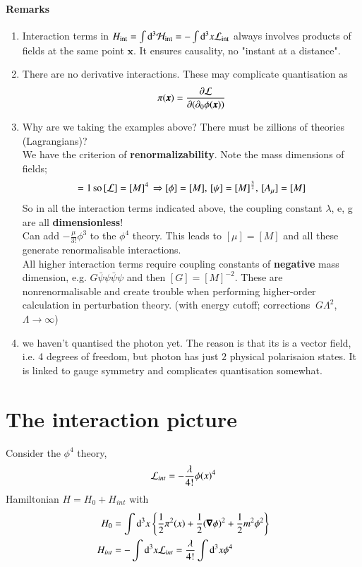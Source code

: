 \paragraph{Remarks}
\begin{enumerate}
	\item Interaction terms in $H_\text{int} = \int \dd^3 \mathcal{H}_\text{int} = - \int\dd^3x\mathcal{L}_\text{int}$ always involves products of fields at the same point $\pmb{x}$. It ensures causality, no "instant at a distance".
	\item There are no derivative interactions. These may complicate quantisation as $$\pi(\pmb{x}) = \frac{\partial\mathcal{L}}{\partial(\partial_0 \phi(\pmb{x}))}$$
	\item Why are we taking the examples above? There must be zillions of theories (Lagrangians)? \\
			We have the criterion of \textbf{renormalizability}. Note the mass dimensions of fields;
			\begin{align*}
				[S] = 1 \, \text{so} \, [\lag] = [M]^4 \, \Rightarrow [\phi] = [M] ,\, [\psi] = [M]^{\frac{3}{2}} ,\, [A_\mu] = [M]
			\end{align*}
			So in all the interaction terms indicated above, the coupling constant $\lambda$, e, g are all \textbf{dimensionless}!\\
			Can add $-\frac{\mu}{3!}\phi^3$ to the $\phi^4$ theory. This leads to $[\mu] = [M]$ and all these generate renormalisable interactions. \\
			All higher interaction terms require coupling constants of \textbf{negative} mass dimension, e.g. $G\bar{\psi}\psi\bar{\psi}\psi$ and then $[G] = [M]^{-2}$. These are nonrenormalisable and create trouble when performing higher-order calculation in perturbation theory.
			(with energy cutoff; corrections $~G\Lambda^2$, $\Lambda \rightarrow \infty$)
		\item we haven't quantised the photon yet. The reason is that its is a vector field, i.e. 4 degrees of freedom, but photon has just $2$ physical polarisaion states. It is linked to gauge symmetry and complicates quantisation somewhat.
\end{enumerate}
\section{The interaction picture}
Consider the $\phi^4$ theory, 
\begin{align}
\mathcal{L}_{int} = -\frac{\lambda}{4!} \phi(x)^4
\end{align}
Hamiltonian $H = H_0 + H_{int}$ with 
\begin{align}
	H_0 &= \int\dd^3 x \left\{ \frac{1}{2}\pi^2(x) + \frac{1}{2}(\pmb{\nabla}\phi)^2 + \frac{1}{2}m^2\phi^2 \right\}\\
	H_{int} &= -\int\dd^3x \mathcal{L}_{int} = \frac{\lambda}{4!}\int\dd^3x \phi^4 
\end{align}

